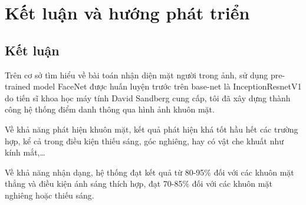 \chapter{Kết luận và hướng phát triển}
\label{cha:chap4}

\section{Kết luận}
Trên cơ sở tìm hiểu về bài toán nhận diện mặt người trong ảnh, sử dụng pre-trained 
model FaceNet được huấn luyện trước trên base-net là InceptionResnetV1 do 
tiến sĩ khoa học máy tính David Sandberg cung cấp, tôi đã xây dựng thành công hệ 
thống điểm danh thông qua hình ảnh khuôn mặt.

Về khả năng phát hiện khuôn mặt, kết quả phát hiện khá tốt hầu hết các trường hợp, 
kể cả trong điều kiện thiếu sáng, góc nghiêng, hay có vật che khuất như kính mắt,…

Về khả năng nhận dạng, hệ thống đạt kết quả từ 80-95\% đối với các khuôn mặt thẳng 
và điều kiện ánh sáng thích hợp, đạt 70-85\% đối với các khuôn mặt nghiêng hoặc 
thiếu sáng.



